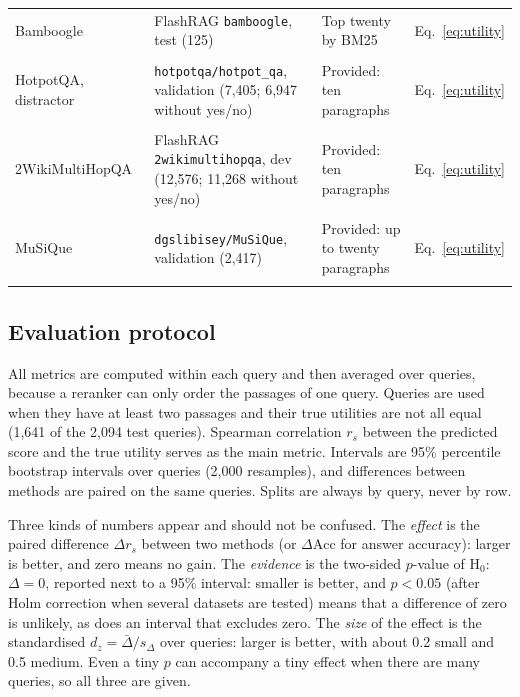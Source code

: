 \documentclass[conference]{IEEEtran}
\begin{document}
\begin{table}[htbp]
\begin{tabularx}{\textwidth}{YYYY}
        Bamboogle~\cite{press2023} & FlashRAG \texttt{bamboogle}, test (125) & Top twenty by BM25 & Eq.~\eqref{eq:utility} \\\\
        HotpotQA, distractor~\cite{yang2018} & \texttt{hotpotqa/hotpot\_qa}, validation (7,405; 6,947 without yes/no) & Provided: ten paragraphs & Eq.~\eqref{eq:utility} \\\\
        2WikiMultiHopQA~\cite{ho2020} & FlashRAG \texttt{2wikimultihopqa}, dev (12,576; 11,268 without yes/no) & Provided: ten paragraphs & Eq.~\eqref{eq:utility} \\\\
        MuSiQue~\cite{trivedi2022} & \texttt{dgslibisey/MuSiQue}, validation (2,417) & Provided: up to twenty paragraphs & Eq.~\eqref{eq:utility} \\\\
        \bottomrule
    \end{tabularx}
\end{table}


\subsection{Evaluation protocol}
All metrics are computed within each query and then averaged over queries, because a reranker can only order the passages of one query. Queries are used when they have at least two passages and their true utilities are not all equal (1,641 of the 2,094 test queries). Spearman correlation $r_s$ between the predicted score and the true utility serves as the main metric. Intervals are 95\% percentile bootstrap intervals over queries (2,000 resamples), and differences between methods are paired on the same queries. Splits are always by query, never by row.

Three kinds of numbers appear and should not be confused. The \emph{effect} is the paired difference $\Delta r_s$ between two methods (or $\Delta\mathrm{Acc}$ for answer accuracy): larger is better, and zero means no gain. The \emph{evidence} is the two-sided $p$-value of H$_0$: $\Delta=0$, reported next to a 95\% interval: smaller is better, and $p<0.05$ (after Holm correction when several datasets are tested) means that a difference of zero is unlikely, as does an interval that excludes zero. The \emph{size} of the effect is the standardised $d_z=\bar{\Delta}/s_{\Delta}$ over queries: larger is better, with about 0.2 small and 0.5 medium. Even a tiny $p$ can accompany a tiny effect when there are many queries, so all three are given.
\end{document}
